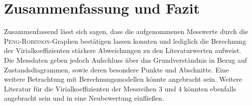 \section{Zusammenfassung und Fazit}
\label{sec:zusammenfassung}

Zusammenfassend lässt sich sagen, dass die aufgenommenen Messwerte durch die \textsc{Peng-Robinson}-Graphen bestätigen lassen konnten und lediglich die Berechnung der Virialkoeffizienten stärkere Abweichungen zu den Literaturwerten aufweist. Die Messdaten geben jedoch Aufschluss über das Grundverständnis in Bezug auf Zustandsdiagrammen, sowie deren besondere Punkte und Abschnitte. Eine weitere Betrachtung mit Berechnungsmodellen könnte angebracht sein. Weitere Literatur für die Virialkoeffizienten der Messreihen 3 und 4 könnten ebenfalls angebracht sein und in eine Neubewertung einfließen.